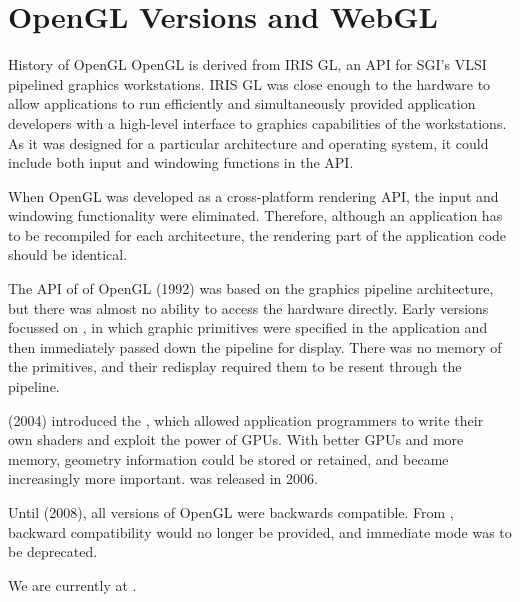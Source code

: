 \documentclass[../COS3712_Notes.tex]{subfiles}
\begin{document}
    \section{OpenGL Versions and WebGL}
      \begin{sidenote}{History of OpenGL}
        OpenGL is derived from IRIS GL,
        an API for SGI's VLSI pipelined graphics workstations.
        IRIS GL was close enough to the hardware to allow applications to run efficiently
        and simultaneously
        provided application developers with a high-level interface
        to graphics capabilities of the workstations.
        As it was designed for a particular architecture and operating system,
        it could include both input and windowing functions in the API.

        When OpenGL was developed as a cross-platform rendering API,
        the input and windowing functionality were eliminated.
        Therefore, although an application has to be recompiled for each architecture,
        the rendering part of the application code should be identical.

        The API of  of OpenGL (1992)
        was based on the graphics pipeline architecture,
        but there was almost no ability to access the hardware directly.
        Early versions focussed on ,
        in which graphic primitives were specified in the application
        and then immediately passed down the pipeline for display.
        There was no memory of the primitives,
        and their redisplay required them to be resent through the pipeline.

         (2004) introduced the ,
        which allowed application programmers to write their own shaders
        and exploit the power of GPUs.
        With better GPUs and more memory,
        geometry information could be stored or retained,
        and  became increasingly more important.
         was released in 2006.

        Until  (2008),
        all versions of OpenGL were backwards compatible.
        From ,
        backward compatibility would no longer be provided,
        and immediate mode was to be deprecated.

        We are currently at .
      \end{sidenote}
\end{document}
